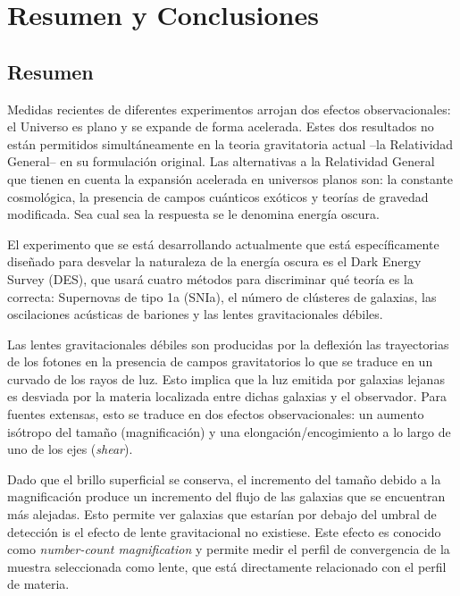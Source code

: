 \chapter*{Resumen y Conclusiones}
\section*{Resumen}
Medidas recientes de diferentes experimentos arrojan dos efectos observacionales: el Universo es plano y se expande de forma acelerada. Estes dos resultados no est\'an permitidos simult\'aneamente en la teoria gravitatoria actual --la Relatividad General-- en su formulaci\'on original. Las alternativas a la Relatividad General que tienen en cuenta la expansi\'on acelerada en universos planos son: la constante cosmol\'ogica, la presencia de campos cu\'anticos ex\'oticos y teor\'ias de gravedad modificada. Sea cual sea la respuesta se le denomina energ\'ia oscura.
\newline

El experimento que se est\'a desarrollando actualmente que est\'a espec\'ificamente dise\~nado para desvelar la naturaleza de la energ\'ia oscura es el Dark Energy Survey (DES), que usar\'a cuatro m\'etodos para discriminar qu\'e teor\'ia es la correcta: Supernovas de tipo 1a (SNIa), el n\'umero de cl\'usteres de galaxias, las oscilaciones ac\'usticas de bariones y las lentes gravitacionales d\'ebiles.
\newline

Las lentes gravitacionales d\'ebiles son producidas por la deflexi\'on las trayectorias de los fotones en la presencia de campos gravitatorios lo que se traduce en un curvado de los rayos de luz. Esto implica que la luz emitida por galaxias lejanas es desviada por la materia localizada entre dichas galaxias y el observador. Para fuentes extensas, esto se traduce en dos efectos observacionales: un aumento is\'otropo del tamaño (magnificaci\'on) y una elongaci\'on/encogimiento a lo largo de uno de los ejes ({\it shear}).
\newline

Dado que el brillo superficial se conserva, el incremento del tama\~no debido a la magnificaci\'on produce un incremento del flujo de las galaxias que se encuentran m\'as alejadas. Esto permite ver galaxias que estar\'ian por debajo del umbral de detecci\'on is el efecto de lente gravitacional no existiese. Este efecto es conocido como {\it number-count magnification} y permite medir el perfil de convergencia de la muestra seleccionada como lente, que est\'a directamente relacionado con el perfil de materia.
\newline

